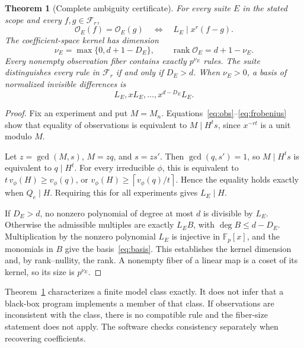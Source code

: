 \documentclass{ijuc}
\newtheorem{theorem}{Theorem}
\newcommand{\Fp}{\mathbb F_p}
\newcommand{\Obs}{\mathcal O}
\newcommand{\rank}{\operatorname{rank}}
\newcommand{\ceil}[1]{\left\lceil #1\right\rceil}
\begin{document}
\begin{theorem}[Complete ambiguity certificate]\label{thm:main}
For every suite $E$ in the stated scope and every $f,g\in\mathcal F_r$,
\begin{equation}
 \Obs_E(f)=\Obs_E(g)
 \quad\Longleftrightarrow\quad L_E\mid x^r(f-g).
 \label{eq:equiv}
\end{equation}
The coefficient-space kernel has dimension
\begin{equation}
 \nu_E=\max\{0,d+1-D_E\},
 \qquad \rank\Obs_E=d+1-\nu_E.
 \label{eq:rank}
\end{equation}
Every nonempty observation fiber contains exactly $p^{\nu_E}$ rules. The suite distinguishes every rule in $\mathcal F_r$ if and only if $D_E>d$. When $\nu_E>0$, a basis of normalized invisible differences is
\begin{equation}
 L_E,xL_E,\ldots,x^{d-D_E}L_E.
 \label{eq:basis}
\end{equation}
\end{theorem}
\begin{proof}
Fix an experiment and put $M=M_n$. Equations~\eqref{eq:obs}--\eqref{eq:frobenius} show that equality of observations is equivalent to $M\mid H^t s$, since $x^{-rt}$ is a unit modulo $M$.

Let $z=\gcd(M,s)$, $M=zq$, and $s=zs'$. Then $\gcd(q,s')=1$, so $M\mid H^t s$ is equivalent to $q\mid H^t$. For every irreducible $\phi$, this is equivalent to $t\,v_\phi(H)\geq v_\phi(q)$, or $v_\phi(H)\geq\ceil{v_\phi(q)/t}$. Hence the equality holds exactly when $Q_e\mid H$. Requiring this for all experiments gives $L_E\mid H$.

If $D_E>d$, no nonzero polynomial of degree at most $d$ is divisible by $L_E$. Otherwise the admissible multiples are exactly $L_E B$, with $\deg B\leq d-D_E$. Multiplication by the nonzero polynomial $L_E$ is injective in $\Fp[x]$, and the monomials in $B$ give the basis~\eqref{eq:basis}. This establishes the kernel dimension and, by rank--nullity, the rank. A nonempty fiber of a linear map is a coset of its kernel, so its size is $p^{\nu_E}$.
\end{proof}

Theorem~\ref{thm:main} characterizes a finite model class exactly. It does not infer that a black-box program implements a member of that class. If observations are inconsistent with the class, there is no compatible rule and the fiber-size statement does not apply. The software checks consistency separately when recovering coefficients.
\end{document}

